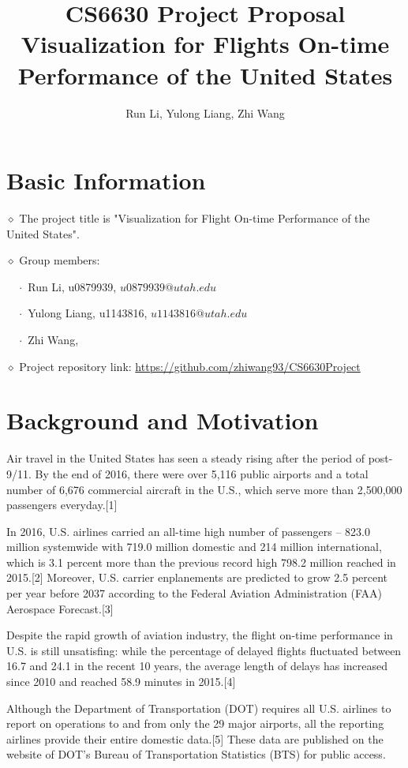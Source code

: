\documentclass[12pt]{article}
\title{CS6630 Project Proposal\\
       Visualization for Flights On-time Performance of the United States}
\author{Run Li, Yulong Liang, Zhi Wang}
\begin{document}
\maketitle

\section{Basic Information}
    $\diamond$ The project title is "Visualization for Flight On-time Performance of the United States".

    $\diamond$ Group members:

    $\quad\cdot$ Run Li, u0879939, $u0879939@utah.edu$

    $\quad\cdot$ Yulong Liang, u1143816, $u1143816@utah.edu$

    $\quad\cdot$ Zhi Wang,

    $\diamond$ Project repository link: \url{https://github.com/zhiwang93/CS6630Project}

\section{Background and Motivation}

Air travel in the United States has seen a steady rising after the period of post-9/11. By the end of 2016, there were over 5,116 public airports and a total number of 6,676 commercial aircraft in the U.S., which serve more than 2,500,000 passengers everyday.[1]

In 2016, U.S. airlines carried an all-time high number of passengers – 823.0 million systemwide with 719.0 million domestic and 214 million international, which is 3.1 percent more than the previous record high 798.2 million reached in 2015.[2] Moreover, U.S. carrier enplanements are predicted to grow 2.5 percent per year before 2037 according to the Federal Aviation Administration (FAA) Aerospace Forecast.[3]

Despite the rapid growth of aviation industry, the flight on-time performance in U.S. is still unsatisfing: while the percentage of delayed flights fluctuated between 16.7 and 24.1 in the recent 10 years, the average length of delays has increased since 2010 and reached 58.9 minutes in 2015.[4]

Although the Department of Transportation (DOT) requires all U.S. airlines to report on operations to and from only the 29 major airports, all the reporting airlines provide their entire domestic data.[5] These data are published on the website of DOT's Bureau of Transportation Statistics (BTS) for public access.
\end{document}
